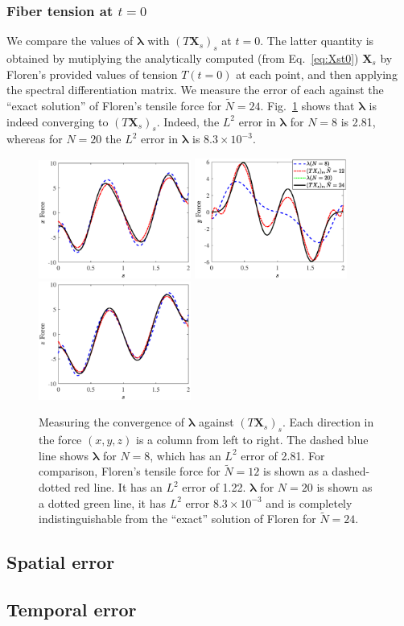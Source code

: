 \documentclass{article}
\begin{document}
\subsubsection{Fiber tension at $t=0$}
We compare the values of $\bm{\lambda}$ with $(T\bm{X}_s)_s$ at $t=0$. The latter quantity is obtained by mutiplying the analytically computed (from Eq.\ \eqref{eq:Xst0}) $\bm{X}_s$ by Floren's provided values of tension $T(t=0)$ at each point, and then applying the spectral differentiation matrix. We measure the error of each against the ``exact solution'' of Floren's tensile force for $\tilde{N}=24$. Fig.\ \ref{fig:tension} shows that $\bm{\lambda}$ is indeed converging to $(T\bm{X}_s)_s$. Indeed, the $L^2$ error in $\bm{\lambda}$ for $N=8$ is 2.81, whereas for $N=20$ the $L^2$ error in $\bm{\lambda}$ is $8.3 \times 10^{-3}$. 
\begin{figure}
\centering
\includegraphics[width=50mm]{Local/TensionX.eps}
\includegraphics[width=50mm]{Local/TensionY.eps}
\includegraphics[width=50mm]{Local/TensionZ.eps}
\caption{Measuring the convergence of $\bm{\lambda}$ against $(T\bm{X}_s)_s$. Each direction in the force $(x,y,z)$ is a column from left to right. The dashed blue line shows $\bm{\lambda}$ for $N=8$, which has an $L^2$ error of 2.81. For comparison, Floren's tensile force for $\tilde{N}=12$ is shown as a dashed-dotted red line. It has an $L^2$ error of 1.22. $\bm{\lambda}$ for $N=20$ is shown as a dotted green line, it has $L^2$ error $8.3 \times 10^{-3}$ and is completely indistinguishable from the ``exact'' solution of Floren for $\tilde{N}=24$. }
\label{fig:tension}
\end{figure}

\subsection{Spatial error}
\label{sec:space}


\subsection{Temporal error}
\label{sec:temp}





\end{document}
